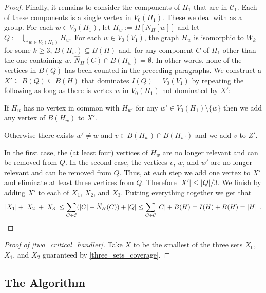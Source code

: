 \documentclass[12pt]{article}
\theoremstyle{definition}
\begin{document}
\begin{proof}
  Finally, it remains to consider the components of $H_1$ that are in $\mathcal{C}_1$. Each of these components is a single vertex in $V_0(H_1)$. These we deal with as a group. For each $w\in V_0(H_1)$, let $H_w:=H[N_H[w]]$ and let $Q:=\bigcup_{w\in V_0(H_1)} H_w$.  For each $w\in V_0(V_1)$, the graph $H_w$ is isomorphic to $W_k$ for some $k\ge 3$, $B(H_w)\subseteq B(H)$ and, for any component $C$ of $H_1$ other than the one containing $w$, $\widehat{N}_H(C)\cap B(H_w)=\emptyset$. In other words, none of the vertices in $B(Q)$ has been counted in the preceding paragraphs.  We construct a $X'\subseteq B(Q)\subseteq B(H)$ that dominates $I(Q)=V_0(V_1)$ by repeating the following as long as there is vertex $w$ in $V_0(H_1)$ not dominated by $X'$:
  \begin{compactenum}
    \item  If $H_w$ has no vertex in common with $H_{w'}$ for any $w'\in V_0(H_1)\setminus\{w\}$ then we add any vertex of $B(H_w)$ to $X'$.
    \item Otherwise there exists $w'\neq w$ and $v\in B(H_w)\cap B(H_{w'})$ and we add $v$ to $Z'$.
  \end{compactenum}
  In the first case, the (at least four) vertices of $H_w$ are no longer relevant and can be removed from $Q$. In the second case, the vertices $v$, $w$, and $w'$ are no longer relevant and can be removed from $Q$. Thus, at each step we add one vertex to $X'$ and eliminate at least three vertices from $Q$.  Therefore $|X'|\le |Q|/3$.  We finish by adding $X'$ to each of $X_1$, $X_2$, and $X_3$.
  Putting everything together we get that
  \[
   |X_1|+|X_2|+|X_3| \le \sum_{C\in\mathcal{C}} (|C|+\widehat{N}_H(C)) + |Q|
   \le \sum_{C\in\mathcal{C}} |C| + B(H) = I(H)+B(H)=|H| \enspace . \qedhere
  \]
\end{proof}

\begin{proof}[Proof of \cref{two_critical_handler}]
  Take $X$ to be the smallest of the three sets $X_0$, $X_1$, and $X_2$ guaranteed by \cref{three_sets_coverage}.
\end{proof}


\subsection{The Algorithm}
\end{document}

